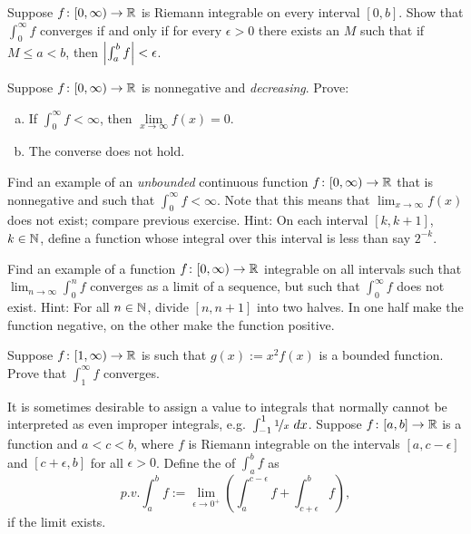 \begin{exercise}
Suppose $f \colon [0,\infty) \to {\mathbb{R}}$ is Riemann integrable on every interval
$[0,b]$.  Show that  $\int_0^\infty f$ converges if and only if
for every $\epsilon > 0$ there exists an $M$ such that if $M \leq a < b$,
then $\left\lvert {\int_a^b f} \right\rvert < \epsilon$.
\end{exercise}

\begin{exercise}
Suppose $f \colon [0,\infty) \to {\mathbb{R}}$ is nonnegative and
\emph{decreasing}.  Prove:
\begin{enumerate}[a)]
\item
If $\int_0^\infty f < \infty$, then $\lim\limits_{x\to\infty} f(x) = 0$.
\item
The converse does not hold.
\end{enumerate}
\end{exercise}

\begin{exercise}
Find an example of an \emph{unbounded} continuous function $f \colon
[0,\infty) \to {\mathbb{R}}$ that is nonnegative and such that $\int_0^\infty f < \infty$.
Note that this means that $\lim_{x\to\infty} f(x)$ does not exist; compare
previous exercise.
Hint: On each interval $[k,k+1]$, $k \in {\mathbb{N}}$, define a function whose
integral over this interval is less than say $2^{-k}$.
\end{exercise}

\begin{exercise}
Find an example of a function $f \colon [0,\infty) \to {\mathbb{R}}$ integrable on all
intervals such that $\lim_{n\to\infty} \int_0^n f$ converges as a
limit of a sequence, but such that
$\int_0^\infty f$ does not exist.
Hint: For all $n\in {\mathbb{N}}$, divide $[n,n+1]$ into two halves.  In one half
make the function negative, on the other make the function positive.
\end{exercise}

\begin{exercise}
Suppose $f \colon [1,\infty) \to {\mathbb{R}}$ is such that
$g(x) := x^2 f(x)$ is a bounded function. Prove that
$\int_1^\infty f$ converges.
\end{exercise}

\begin{exnote}
It is sometimes desirable to assign a value to integrals that normally
cannot be interpreted as even improper integrals,
e.g.\ $\int_{-1}^1 \nicefrac{1}{x}~dx$.
Suppose $f \colon [a,b] \to {\mathbb{R}}$ is a function and $a < c < b$,
where $f$ is Riemann integrable on the intervals
$[a,c-\epsilon]$ and $[c+\epsilon,b]$ for all $\epsilon > 0$.
Define
the \emph{} of $\int_a^b f$ as
\begin{equation*}
p.v.\!\int_a^b f := \lim_{\epsilon\to 0^+}
\left(
\int_a^{c-\epsilon} f + 
\int_{c+\epsilon}^b f
\right) ,
\end{equation*}
if the limit exists.
\end{exnote}

